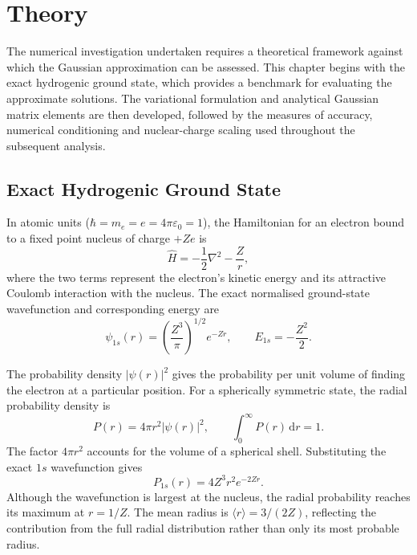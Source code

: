 
\chapter{Theory}
\label{chap:theory}


The numerical investigation undertaken requires a theoretical framework against
which the Gaussian approximation can be assessed. This chapter begins
with the exact hydrogenic ground state, which provides a benchmark
for evaluating the approximate solutions. The variational formulation
and analytical Gaussian matrix elements are then developed, followed
by the measures of accuracy, numerical conditioning and nuclear-charge
scaling used throughout the subsequent analysis.

\section{Exact Hydrogenic Ground State}

In atomic units
($\hbar=m_e=e=4\pi\varepsilon_0=1$),
the Hamiltonian for an electron bound to a fixed
point nucleus of charge $+Ze$ is
\begin{equation}
    \hat H=-\frac12\nabla^2-\frac{Z}{r},
    \label{eq:hydrogen_hamiltonian}
\end{equation}
where the two terms represent the electron's kinetic
energy and its attractive Coulomb interaction with
the nucleus. The exact normalised ground-state
wavefunction and corresponding energy are
\cite{bransden_physics_2009}
\begin{equation}
    \psi_{1s}(r)
    =\left(\frac{Z^3}{\pi}\right)^{1/2}e^{-Zr},
    \qquad
    E_{1s}=-\frac{Z^2}{2}.
    \label{eq:exact_state}
\end{equation}

The probability density $|\psi(r)|^2$ gives the
probability per unit volume of finding the electron
at a particular position. For a spherically
symmetric state, the radial probability density is
\begin{equation}
    P(r)=4\pi r^2|\psi(r)|^2,
    \qquad
    \int_0^\infty P(r)\,\mathrm dr=1.
    \label{eq:radial_probability}
\end{equation}
The factor $4\pi r^2$ accounts for the volume of a
spherical shell. Substituting the exact $1s$
wavefunction gives
\[
    P_{1s}(r)=4Z^3r^2e^{-2Zr}.
\]
Although the wavefunction is largest at the nucleus,
the radial probability reaches its maximum at
$r=1/Z$. The mean radius is
$\langle r\rangle=3/(2Z)$, reflecting the contribution
from the full radial distribution rather than only
its most probable radius.

